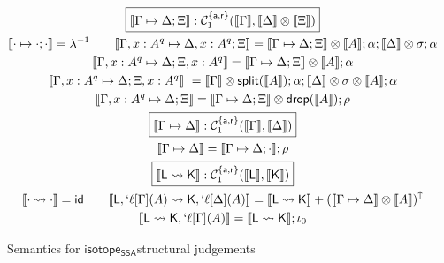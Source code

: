 \documentclass[acmsmall,screen,review]{acmart}
\newcommand{\mc}[1]{\ensuremath{\mathcal{#1}}}
\newcommand{\mb}[1]{\ensuremath{\mathbf{#1}}}
\newcommand{\ms}[1]{\ensuremath{\mathsf{#1}}}
\newcommand{\lbl}[1]{{`#1}}
\newcommand{\csplits}[3]{#1 \mapsto #2;#3}
\newcommand{\cwk}[2]{#1 \mapsto #2}
\newcommand{\lwk}[2]{#1 \rightsquigarrow #2}
\newcommand{\tlin}[2]{#2 \subseteq \ms{lin}(#1)}
\newcommand{\thyp}[3]{#1: {#2}^{#3}}
\newcommand{\lhyp}[3]{#1[#2](#3)}
\newcommand{\llhyp}[3]{\lhyp{\lbl{#1}}{#2}{#3}}
\newcommand{\taff}{{\{\ms{a}\}}}
\newcommand{\trel}{{\{\ms{r}\}}}
\newcommand{\tint}{{\{\ms{a}, \ms{r}\}}}
\newcommand{\dnt}[1]{\llbracket{#1}\rrbracket}
\newcommand{\upg}[2]{{#1}^{\uparrow #2}}
\newcommand{\isotopessa}{\ms{isotope_{SSA}}}
\begin{document}
\begin{figure}
  \begin{gather*}
    \boxed{\dnt{\csplits{\Gamma}{\Delta}{\Xi}}
      : \mc{C}_1^\tint(\dnt{\Gamma}, \dnt{\Delta} \otimes \dnt{\Xi})}
      \\
    \dnt{\csplits{\cdot}{\cdot}{\cdot}} = \lambda^{-1} \qquad
    \dnt{\csplits
      {\Gamma, \thyp{x}{A}{q}}
      {\Delta, \thyp{x}{A}{q}}
      {\Xi}} 
      = \dnt{\csplits{\Gamma}{\Delta}{\Xi}} \otimes \dnt{A};\alpha;\dnt{\Delta} \otimes \sigma;\alpha 
      \\
    \dnt{\csplits
      {\Gamma, \thyp{x}{A}{q}}
      {\Delta}
      {\Xi, \thyp{x}{A}{q}}} 
      = \dnt{\csplits{\Gamma}{\Delta}{\Xi}} \otimes \dnt{A};\alpha 
      \\
    \dnt{\csplits
      {\Gamma, \thyp{x}{A}{q}}
      {\Delta}
      {\Xi, \thyp{x}{A}{q}}} \
      = \dnt{\Gamma} \otimes \ms{split}(\dnt{A});
        \alpha;
        \dnt{\Delta} \otimes \sigma \otimes \dnt{A};
        \alpha 
        \\
    \dnt{\csplits
      {\Gamma, \thyp{x}{A}{q}}
      {\Delta}
      {\Xi}}
      = \dnt{\csplits{\Gamma}{\Delta}{\Xi}}
        \otimes \ms{drop}(\dnt{A})
      ; \rho 
      \\
    \boxed{\dnt{\cwk{\Gamma}{\Delta}}
      : \mc{C}_1^\tint(\dnt{\Gamma}, \dnt{\Delta})} 
      \\
      \dnt{\cwk{\Gamma}{\Delta}} 
      = \dnt{\csplits{\Gamma}{\Delta}{\cdot}};\rho 
      \\
    \boxed{\dnt{\lwk{\ms{L}}{\ms{K}}}
      : \mc{C}_1^\tint(\dnt{\ms{L}}, \dnt{\ms{K}})} 
      \\
    \dnt{\lwk{\cdot}{\cdot}} = \ms{id} \qquad
    \dnt{\lwk
      {\ms{L}, \llhyp{\ell}{\Gamma}{A}}
      {\ms{K}, \llhyp{\ell}{\Delta}{A}}}
      = \dnt{\lwk{\ms{L}}{\ms{K}}} + \upg{(\dnt{\cwk{\Gamma}{\Delta}} \otimes \dnt{A})}{} 
      \\
    \dnt{\lwk{\ms{L}}{\ms{K}, \llhyp{\ell}{\Gamma}{A}}}
      = \dnt{\lwk{\ms{L}}{\ms{K}}};\iota_0
  \end{gather*}
  \caption{Semantics for \isotopessa structural judgements}
  \label{fig:ssa-structural-semantics}
\end{figure}
\end{document}
